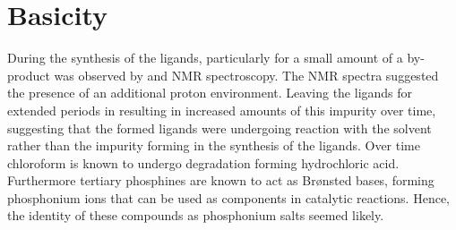 {%



\section{Basicity}
\label{section:ligands:basicity}

During the synthesis of the \tBuxantphos{} ligands, particularly for \tBusixantphos{} a small amount of a by-product was observed by \phosphorus{} and \proton{} NMR spectroscopy.  The \proton{} NMR spectra suggested the presence of an additional proton environment.  Leaving the ligands for extended periods in  resulting in increased amounts of this impurity over time, suggesting that the formed \tBuxantphos{} ligands were undergoing reaction with the solvent rather than the impurity forming in the synthesis of the ligands.  Over time chloroform is known to undergo degradation forming hydrochloric acid.\cite{Yano1977}  Furthermore tertiary phosphines are known to act as Br\o nsted bases, forming phosphonium ions that can be used as components in catalytic reactions.\cite{Netherton2001}  Hence, the identity of these compounds as phosphonium salts seemed likely.


}
